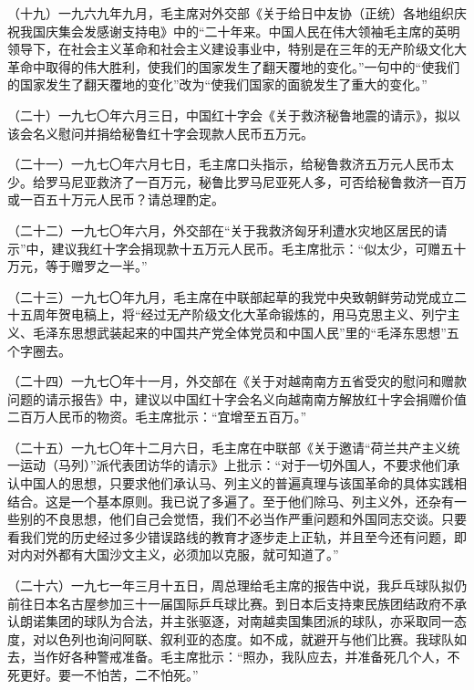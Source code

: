 （十九）一九六九年九月，毛主席对外交部《关于给日中友协（正统）各地组织庆祝我国庆集会发感谢支持电》中的“二十年来。中国人民在伟大领袖毛主席的英明领导下，在社会主义革命和社会主义建设事业中，特别是在三年的无产阶级文化大革命中取得的伟大胜利，使我们的国家发生了翻天覆地的变化。”一句中的“使我们的国家发生了翻天覆地的变化”改为“使我们国家的面貌发生了重大的变化。”

（二十）一九七〇年六月三日，中国红十字会《关于救济秘鲁地震的请示》，拟以该会名义慰问并捐给秘鲁红十字会现款人民币五万元。

（二十一）一九七〇年六月七日，毛主席口头指示，给秘鲁救济五万元人民币太少。给罗马尼亚救济了一百万元，秘鲁比罗马尼亚死人多，可否给秘鲁救济一百万或一百五十万元人民币？请总理酌定。

（二十二）一九七〇年六月，外交部在“关于我救济匈牙利遭水灾地区居民的请示”中，建议我红十字会捐现款十五万元人民币。毛主席批示：“似太少，可赠五十万元，等于赠罗之一半。”

（二十三）一九七〇年九月，毛主席在中联部起草的我党中央致朝鲜劳动党成立二十五周年贺电稿上，将“经过无产阶级文化大革命锻炼的，用马克思主义、列宁主义、毛泽东思想武装起来的中国共产党全体党员和中国人民”里的“毛泽东思想”五个字圈去。

（二十四）一九七〇年十一月，外交部在《关于对越南南方五省受灾的慰问和赠款问题的请示报告》中，建议以中国红十字会名义向越南南方解放红十字会捐赠价值二百万人民币的物资。毛主席批示：“宜增至五百万。”

（二十五）一九七〇年十二月六日，毛主席在中联部《关于邀请“荷兰共产主义统一运动（马列）”派代表团访华的请示》上批示：“对于一切外国人，不要求他们承认中国人的思想，只要求他们承认马、列主义的普遍真理与该国革命的具体实践相结合。这是一个基本原则。我已说了多遍了。至于他们除马、列主义外，还杂有一些别的不良思想，他们自己会觉悟，我们不必当作严重问题和外国同志交谈。只要看我们党的历史经过多少错误路线的教育才逐步走上正轨，并且至今还有问题，即对内对外都有大国沙文主义，必须加以克服，就可知道了。”

（二十六）一九七一年三月十五日，周总理给毛主席的报告中说，我乒乓球队拟仍前往日本名古屋参加三十一届国际乒乓球比赛。到日本后支持柬民族团结政府不承认朗诺集团的球队为合法，并主张驱逐，对南越卖国集团派的球队，亦采取同一态度，对以色列也询问阿联、叙利亚的态度。如不成，就避开与他们比赛。我球队如去，当作好各种警戒准备。毛主席批示：“照办，我队应去，并准备死几个人，不死更好。要一不怕苦，二不怕死。”
